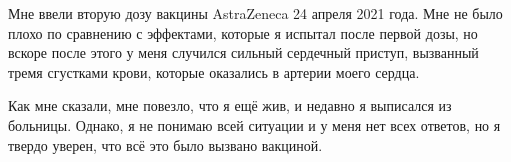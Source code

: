 Мне ввели вторую дозу вакцины AstraZeneca 24 апреля 2021 года. Мне не было плохо
по сравнению с эффектами, которые я испытал после первой дозы, но вскоре после
этого у меня случился сильный сердечный приступ, вызванный тремя сгустками
крови, которые оказались в артерии моего сердца.

Как мне сказали, мне повезло, что я ещё жив, и недавно я выписался из
больницы. Однако, я не понимаю всей ситуации и у меня нет всех ответов, но я
твердо уверен, что всё это было вызвано вакциной.
